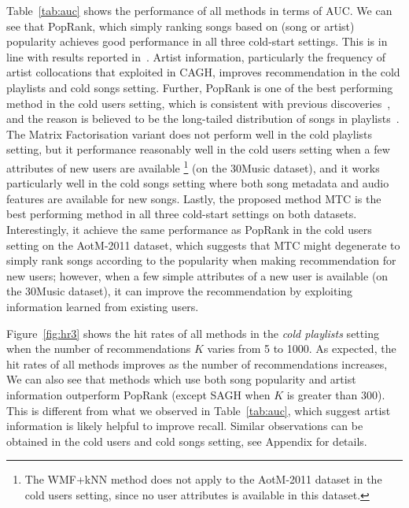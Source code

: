 Table~\ref{tab:auc} shows the performance of all methods in terms of AUC.
We can see that PopRank, which simply ranking songs based on (song or artist) popularity 
achieves good performance in all three cold-start settings.
This is in line with results reported in~\cite{bonnin2013evaluating,bonnin2015automated}.
Artist information, particularly the frequency of artist collocations that exploited in CAGH, 
improves recommendation in the cold playlists and cold songs setting.
Further, PopRank is one of the best performing method in the cold users setting,
which is consistent with previous discoveries~\cite{mcfee2012million,bonnin2013evaluating,bonnin2015automated},
and the reason is believed to be the long-tailed distribution of songs in
playlists~\cite{cremonesi2010performance,bonnin2013evaluating}.
The Matrix Factorisation variant does not perform well in the cold playlists setting,
but it performance reasonably well in the cold users setting when a few attributes of new users are available
\footnote{The WMF+kNN method does not apply to the AotM-2011 dataset in the cold users setting,
since no user attributes is available in this dataset.}
(\eg on the 30Music dataset),
and it works particularly well in the cold songs setting where both song metadata and audio features are available 
for new songs.
Lastly, the proposed method MTC is the best performing method in all three cold-start settings on both datasets.
Interestingly, it achieve the same performance as PopRank in the cold users setting on the AotM-2011 dataset,
which suggests that MTC might degenerate to simply rank songs according to the popularity when making recommendation
for new users; however, when a few simple attributes of a new user is available (\eg on the 30Music dataset), 
it can improve the recommendation by exploiting information learned from existing users.


Figure~\ref{fig:hr3} shows the hit rates of all methods in the \emph{cold playlists} setting
when the number of recommendations $K$ varies from 5 to 1000.
As expected, the hit rates of all methods improves as the number of recommendations increases,
We can also see that methods which use both song popularity and artist information outperform PopRank
(except SAGH when $K$ is greater than 300).
This is different from what we observed in Table~\ref{tab:auc},
which suggest artist information is likely helpful to improve recall.
Similar observations can be obtained in the cold users and cold songs setting, see Appendix for details. 


